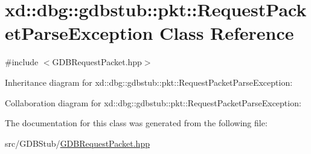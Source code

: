 \hypertarget{classxd_1_1dbg_1_1gdbstub_1_1pkt_1_1_request_packet_parse_exception}{}\section{xd\+:\+:dbg\+:\+:gdbstub\+:\+:pkt\+:\+:Request\+Packet\+Parse\+Exception Class Reference}
\label{classxd_1_1dbg_1_1gdbstub_1_1pkt_1_1_request_packet_parse_exception}


{\ttfamily \#include $<$G\+D\+B\+Request\+Packet.\+hpp$>$}



Inheritance diagram for xd\+:\+:dbg\+:\+:gdbstub\+:\+:pkt\+:\+:Request\+Packet\+Parse\+Exception\+:


Collaboration diagram for xd\+:\+:dbg\+:\+:gdbstub\+:\+:pkt\+:\+:Request\+Packet\+Parse\+Exception\+:


The documentation for this class was generated from the following file\+:\begin{DoxyCompactItemize}
\item 
src/\+G\+D\+B\+Stub/\mbox{\hyperlink{_g_d_b_request_packet_8hpp}{G\+D\+B\+Request\+Packet.\+hpp}}\end{DoxyCompactItemize}

